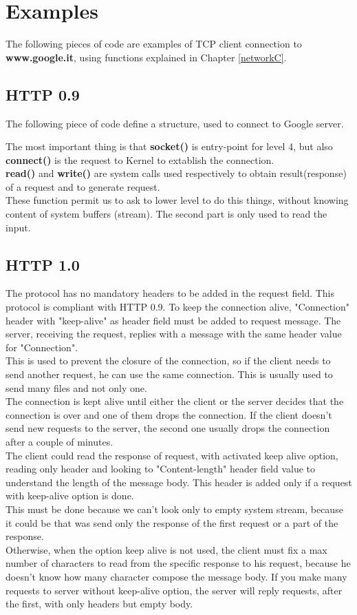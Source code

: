 \vspace{10cm}
\section{Examples}
The following pieces of code are examples of TCP client connection to \textbf{www.google.it}, using functions explained in Chapter \ref{networkC}.
\subsection{HTTP 0.9}
The following piece of code define a structure, used to connect to Google server. 

The most important thing is that \textbf{socket()} is entry-point for level 4, but also \textbf{connect()} is the request to Kernel to extablish the connection.\\ \textbf{read()} and \textbf{write()} are system calls used respectively to obtain result(response) of a request and to generate request.\\ These function permit us to ask to lower level to do this things, without knowing content of system buffers (stream). The second part is only used to read the input.

\subsection{HTTP 1.0}
The protocol has no mandatory headers to be added in the request field. This protocol is compliant with HTTP 0.9.
To keep the connection alive, "Connection" header with "keep-alive" as header field must be added to request message. The server, receiving the request, replies with a message with the same header value for "Connection".\\
This is used to prevent the closure of the connection, so if the client needs to send another request, he can use the same connection.
This is usually used to send many files and not only one.\\
The connection is kept alive until either the client or the server decides that the connection is over and one of them drops the connection. If the client doesn't send new requests to the server, the second one usually drops the connection after a couple of minutes.\\
The client could read the response of request, with activated keep alive option, reading only header and looking to "Content-length" header field value to understand the length of the message body. This header is added only if a request with keep-alive option is done.\\
This must be done because we can't look only to empty system stream, because it could be that was send only the response of the first request or a part of the response.\\
Otherwise, when the option keep alive is not used, the client must fix a max number of characters to read from the specific response to his request, because he doesn't know how many character compose the message body. If you make many requests to server without keep-alive option, the server will reply requests, after the first, with only headers but empty body.\\

